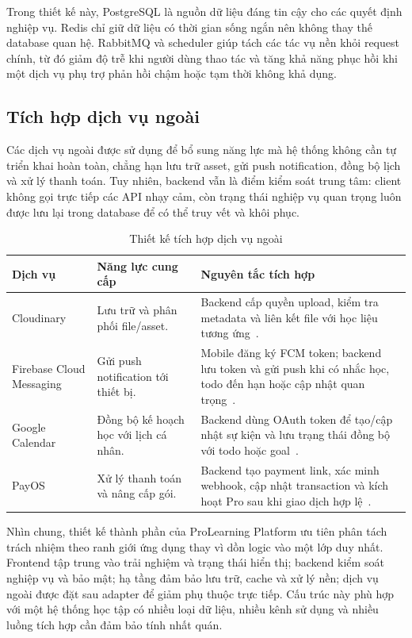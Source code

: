 Trong thiết kế này, PostgreSQL là nguồn dữ liệu đáng tin cậy cho các quyết định nghiệp vụ. Redis chỉ giữ dữ liệu có thời gian sống ngắn nên không thay thế database quan hệ. RabbitMQ và scheduler giúp tách các tác vụ nền khỏi request chính, từ đó giảm độ trễ khi người dùng thao tác và tăng khả năng phục hồi khi một dịch vụ phụ trợ phản hồi chậm hoặc tạm thời không khả dụng.

\subsection{Tích hợp dịch vụ ngoài}
\label{subsec:external-service-design}

Các dịch vụ ngoài được sử dụng để bổ sung năng lực mà hệ thống không cần tự triển khai hoàn toàn, chẳng hạn lưu trữ asset, gửi push notification, đồng bộ lịch và xử lý thanh toán. Tuy nhiên, backend vẫn là điểm kiểm soát trung tâm: client không gọi trực tiếp các API nhạy cảm, còn trạng thái nghiệp vụ quan trọng luôn được lưu lại trong database để có thể truy vết và khôi phục.

\begin{table}[htbp]
    \centering
    \small
    \caption{Thiết kế tích hợp dịch vụ ngoài}
    \label{tab:external-service-design}
    \renewcommand{\arraystretch}{1.15}
    \begin{tabular}{|p{}|p{}|p{}|}
        \hline
        \textbf{Dịch vụ} & \textbf{Năng lực cung cấp} & \textbf{Nguyên tắc tích hợp} \\
        \hline
        Cloudinary & Lưu trữ và phân phối file/asset. & Backend cấp quyền upload, kiểm tra metadata và liên kết file với học liệu tương ứng~\cite{cloudinaryjava}. \\
        \hline
        Firebase Cloud Messaging & Gửi push notification tới thiết bị. & Mobile đăng ký FCM token; backend lưu token và gửi push khi có nhắc học, todo đến hạn hoặc cập nhật quan trọng~\cite{firebasefcm}. \\
        \hline
        Google Calendar & Đồng bộ kế hoạch học với lịch cá nhân. & Backend dùng OAuth token để tạo/cập nhật sự kiện và lưu trạng thái đồng bộ với todo hoặc goal~\cite{googlecalendarjava}. \\
        \hline
        PayOS & Xử lý thanh toán và nâng cấp gói. & Backend tạo payment link, xác minh webhook, cập nhật transaction và kích hoạt Pro sau khi giao dịch hợp lệ~\cite{payoswebhook}. \\
        \hline
    \end{tabular}
\end{table}

Nhìn chung, thiết kế thành phần của ProLearning Platform ưu tiên phân tách trách nhiệm theo ranh giới ứng dụng thay vì dồn logic vào một lớp duy nhất. Frontend tập trung vào trải nghiệm và trạng thái hiển thị; backend kiểm soát nghiệp vụ và bảo mật; hạ tầng đảm bảo lưu trữ, cache và xử lý nền; dịch vụ ngoài được đặt sau adapter để giảm phụ thuộc trực tiếp. Cấu trúc này phù hợp với một hệ thống học tập có nhiều loại dữ liệu, nhiều kênh sử dụng và nhiều luồng tích hợp cần đảm bảo tính nhất quán.

\endgroup